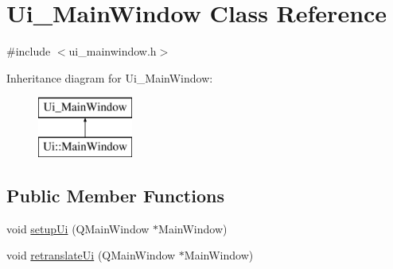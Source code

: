 \hypertarget{class_ui___main_window}{\section{Ui\-\_\-\-Main\-Window Class Reference}
\label{class_ui___main_window}
}


{\ttfamily \#include $<$ui\-\_\-mainwindow.\-h$>$}

Inheritance diagram for Ui\-\_\-\-Main\-Window\-:\begin{figure}[H]
\begin{center}
\leavevmode
\includegraphics[height=2.000000cm]{class_ui___main_window}
\end{center}
\end{figure}
\subsection*{Public Member Functions}
\begin{DoxyCompactItemize}
\item 
void \hyperlink{class_ui___main_window_acf4a0872c4c77d8f43a2ec66ed849b58}{setup\-Ui} (Q\-Main\-Window $\ast$Main\-Window)
\item 
void \hyperlink{class_ui___main_window_a097dd160c3534a204904cb374412c618}{retranslate\-Ui} (Q\-Main\-Window $\ast$Main\-Window)
\end{DoxyCompactItemize}
